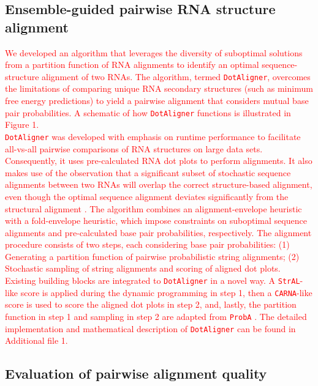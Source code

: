 \documentclass{bmcart}
\newcommand\dotaligner{\texttt{DotAligner}}
\newcommand\carna{\texttt{CARNA}}
\begin{document}
\subsection*{Ensemble-guided pairwise RNA structure alignment} 
 
\textcolor{red}{
We developed an algorithm that leverages the diversity of suboptimal solutions from a partition
function of RNA alignments to identify an optimal sequence-structure alignment
of two RNAs. The algorithm, termed  \dotaligner{}, overcomes the limitations of comparing unique RNA
secondary structures (such as minimum free energy predictions) to yield a
pairwise alignment that considers mutual base pair probabilities. 
A schematic of how \dotaligner{} functions is illustrated in Figure 1.} \\

\textcolor{red}{
\dotaligner{} was developed with emphasis on runtime performance to 
facilitate all-vs-all pairwise comparisons of RNA structures on large data sets. 
Consequently, it uses pre-calculated RNA dot plots to perform alignments. 
It also makes use of the observation that a significant subset of stochastic sequence alignments 
 between two RNAs will overlap the correct structure-based alignment, even though 
 the optimal sequence alignment deviates significantly from the structural alignment \cite{Muckstein12385998}. 
The algorithm combines an alignment-envelope heuristic with a fold-envelope 
heuristic, which impose constraints on suboptimal sequence alignments and  
pre-calculated base pair probabilities, respectively. 
The alignment procedure consists of two steps, each considering base pair probabilities:
(1) Generating a partition function of pairwise probabilistic string alignments; 
(2) Stochastic sampling of string alignments and scoring of aligned dot plots.
Existing building blocks are integrated to \dotaligner{} in a novel way. 
A \texttt{StrAL}-like score is applied during the dynamic programming in step 1, 
then a \carna-like score is used to score the aligned dot plots in step 2, 
and, lastly, the partition function in step 1 and sampling in step 2 are adapted
from \texttt{ProbA} \cite{Muckstein12385998}. The detailed implementation 
and mathematical description of \dotaligner{} can be found in Additional file 1.\\
}

\subsection*{ Evaluation of pairwise alignment quality}
\end{document}

